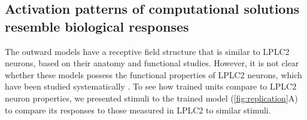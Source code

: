 \documentclass[pdftex,9pt,lineno]{elife}
\begin{document}
\begin{figure}
\label{figsupp:sf1_outward_prevail}
\end{figure}

\subsection{Activation patterns of computational solutions resemble biological responses}

The outward models have a receptive field structure that is similar to LPLC2 neurons, based on their anatomy and functional studies. However, it is not clear whether these models possess the functional properties of LPLC2 neurons, which have been studied systematically \citep{klapoetke2017ultra,von2017feature,ache2019neural}. To see how trained units compare to LPLC2 neuron properties, we presented stimuli to the trained model (\ref{fig:replication}A) to compare its responses to those measured in LPLC2 to similar stimuli.
\end{document}
